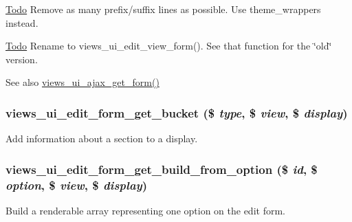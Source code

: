 \begin{Desc}
\item[\hyperlink{todo__todo000048}{Todo}]Remove as many prefix/suffix lines as possible. Use theme\_\-wrappers instead.\end{Desc}
\begin{Desc}
\item[\hyperlink{todo__todo000049}{Todo}]Rename to views\_\-ui\_\-edit\_\-view\_\-form(). See that function for the \char`\"{}old\char`\"{} version.\end{Desc}
\begin{DoxySeeAlso}{See also}
\hyperlink{views__ui_8module_a869b55ec9965e41d8498ff9269b652b7}{views\_\-ui\_\-ajax\_\-get\_\-form()} 
\end{DoxySeeAlso}
\hypertarget{admin_8inc_a926e3094317ec9bef205685362981d39}{
\subsubsection[{views\_\-ui\_\-edit\_\-form\_\-get\_\-bucket}]{\setlength{\rightskip}{0pt plus 5cm}views\_\-ui\_\-edit\_\-form\_\-get\_\-bucket (\$ {\em type}, \/  \$ {\em view}, \/  \$ {\em display})}}
\label{admin_8inc_a926e3094317ec9bef205685362981d39}
Add information about a section to a display. \hypertarget{admin_8inc_ac3afa3d1dfc328770b843c2127a2f9f8}{
\subsubsection[{views\_\-ui\_\-edit\_\-form\_\-get\_\-build\_\-from\_\-option}]{\setlength{\rightskip}{0pt plus 5cm}views\_\-ui\_\-edit\_\-form\_\-get\_\-build\_\-from\_\-option (\$ {\em id}, \/  \$ {\em option}, \/  \$ {\em view}, \/  \$ {\em display})}}
\label{admin_8inc_ac3afa3d1dfc328770b843c2127a2f9f8}
Build a renderable array representing one option on the edit form.

